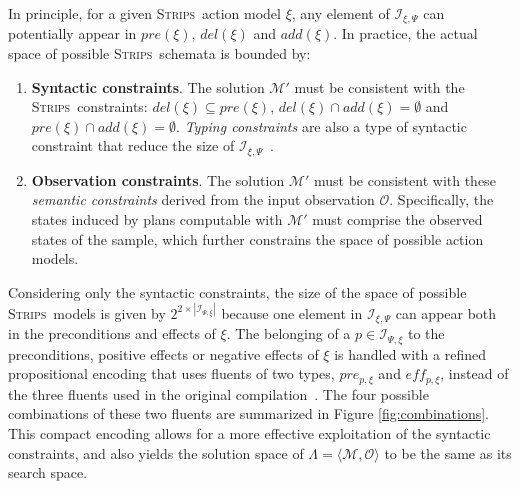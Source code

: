 \documentclass[runningheads]{llncs}
\newcommand{\tup}[1]{{\langle #1 \rangle}}
\newcommand{\strips}{\textsc{Strips}}     %
\begin{document}
In principle, for a given \strips\ action model $\xi$, any element of ${\mathcal I}_{\xi,\Psi}$ can potentially appear in $pre(\xi)$, $del(\xi)$ and $add(\xi)$. In practice, the actual space of possible \strips\ schemata is bounded by:
\begin{enumerate}
\item {\bf Syntactic constraints}. The solution $\mathcal{M}'$ must be consistent with the \strips\ constraints: $del(\xi)\subseteq pre(\xi)$, $del(\xi)\cap add(\xi)=\emptyset$ and $pre(\xi)\cap add(\xi)=\emptyset$. {\em Typing constraints} are also a type of syntactic constraint that reduce the size of ${\mathcal I}_{\xi,\Psi}$~\cite{mcdermott1998pddl}.
\item {\bf Observation constraints}. The solution $\mathcal{M}'$ must be consistent with these \emph{semantic constraints} derived from the input observation $\mathcal{O}$. Specifically, the states induced by plans computable with $\mathcal{M}'$ must comprise the observed states of the sample, which further constrains the space of possible action models.
\end{enumerate}

Considering only the syntactic constraints, the size of the space of possible \strips\ models is given by $2^{2\times|{\mathcal I}_{\Psi,\xi}|}$ because one element in $\mathcal{I}_{\xi,\Psi}$ can appear both in the preconditions and effects of $\xi$. The belonging of a $p \in \mathcal{I}_{\Psi,\xi}$ to the preconditions, positive effects or negative effects of $\xi$ is handled with a refined propositional encoding that uses fluents of two types, $pre_{p,\xi}$ and $eff_{p,\xi}$, instead of the three fluents used in the original compilation~\cite{aineto2018learning}. The four possible combinations of these two fluents are summarized in Figure \ref{fig:combinations}. This compact encoding allows for a more effective exploitation of the syntactic constraints, and also yields the solution space of $\Lambda=\tup{\mathcal{M},{\mathcal O}}$ to be the same as its search space.
\end{document}
